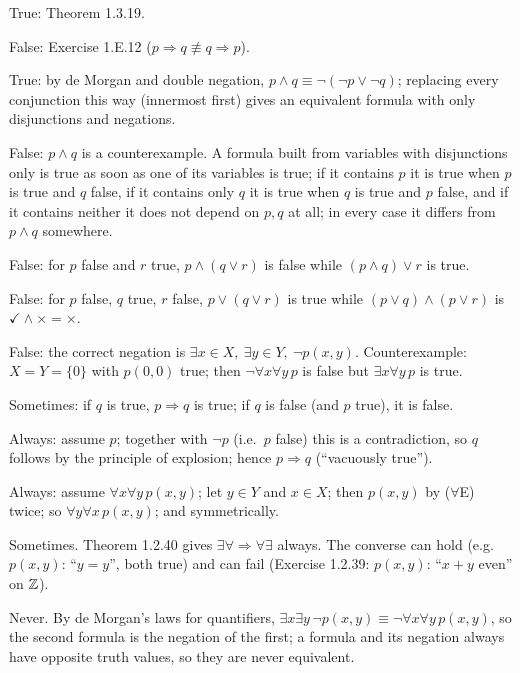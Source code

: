  True: Theorem 1.3.19.

 False: Exercise 1.E.12 ($p\Rightarrow q\not\equiv q\Rightarrow p$).

 True: by de Morgan and double negation, $p\wedge q\equiv\neg(\neg p\vee\neg q)$; replacing every conjunction this way (innermost first) gives an equivalent formula with only disjunctions and negations.

 False: $p\wedge q$ is a counterexample. A formula built from variables with disjunctions only is true as soon as one of its variables is true; if it contains $p$ it is true when $p$ is true and $q$ false, if it contains only $q$ it is true when $q$ is true and $p$ false, and if it contains neither it does not depend on $p,q$ at all; in every case it differs from $p\wedge q$ somewhere.

 False: for $p$ false and $r$ true, $p\wedge(q\vee r)$ is false while $(p\wedge q)\vee r$ is true.

 False: for $p$ false, $q$ true, $r$ false, $p\vee(q\vee r)$ is true while $(p\vee q)\wedge(p\vee r)$ is $\checkmark\wedge\times=\times$.

 False: the correct negation is $\exists x\in X,\ \exists y\in Y,\ \neg p(x,y)$. Counterexample: $X=Y=\{0\}$ with $p(0,0)$ true; then $\neg\forall x\forall y\,p$ is false but $\exists x\forall y\,p$ is true.

 Sometimes: if $q$ is true, $p\Rightarrow q$ is true; if $q$ is false (and $p$ true), it is false.

 Always: assume $p$; together with $\neg p$ (i.e.\ $p$ false) this is a contradiction, so $q$ follows by the principle of explosion; hence $p\Rightarrow q$ (``vacuously true'').

 Always: assume $\forall x\forall y\,p(x,y)$; let $y\in Y$ and $x\in X$; then $p(x,y)$ by ($\forall$E) twice; so $\forall y\forall x\,p(x,y)$; and symmetrically.

 Sometimes. Theorem 1.2.40 gives $\exists\forall\Rightarrow\forall\exists$ always. The converse can hold (e.g.\ $p(x,y)$: ``$y=y$'', both true) and can fail (Exercise 1.2.39: $p(x,y)$: ``$x+y$ even'' on $\mathbb{Z}$).

 Never. By de Morgan's laws for quantifiers, $\exists x\exists y\,\neg p(x,y)\equiv\neg\forall x\forall y\,p(x,y)$, so the second formula is the negation of the first; a formula and its negation always have opposite truth values, so they are never equivalent.

